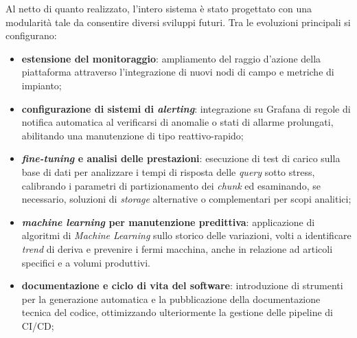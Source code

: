 \documentclass[12pt]{article}
\begin{document}
    Al netto di quanto realizzato, l'intero sistema è stato progettato con una modularità tale da consentire diversi sviluppi futuri. Tra le evoluzioni principali si configurano:
    \begin{itemize}
        \item \textbf{estensione del monitoraggio}: ampliamento del raggio d'azione della piattaforma attraverso l'integrazione di nuovi nodi di campo e metriche di impianto;
        \item \textbf{configurazione di sistemi di \textit{alerting}}: integrazione su Grafana di regole di notifica automatica al verificarsi di anomalie o stati di allarme prolungati, abilitando una manutenzione di tipo reattivo-rapido;
        \item \textbf{\textit{fine-tuning} e analisi delle prestazioni}: esecuzione di test di carico sulla base di dati per analizzare i tempi di risposta delle \textit{query} sotto stress, calibrando i parametri di partizionamento dei \textit{chunk} ed esaminando, se necessario, soluzioni di \textit{storage} alternative o complementari per scopi analitici;
        \item \textbf{\textit{machine learning} per manutenzione predittiva}: applicazione di algoritmi di \textit{Machine Learning} sullo storico delle variazioni, volti a identificare \textit{trend} di deriva e prevenire i fermi macchina, anche in relazione ad articoli specifici e a volumi produttivi.
        \item \textbf{documentazione e ciclo di vita del software}: introduzione di strumenti per la generazione automatica e la pubblicazione della documentazione tecnica del codice, ottimizzando ulteriormente la gestione delle pipeline di CI/CD;
    \end{itemize}
    
\end{document}
